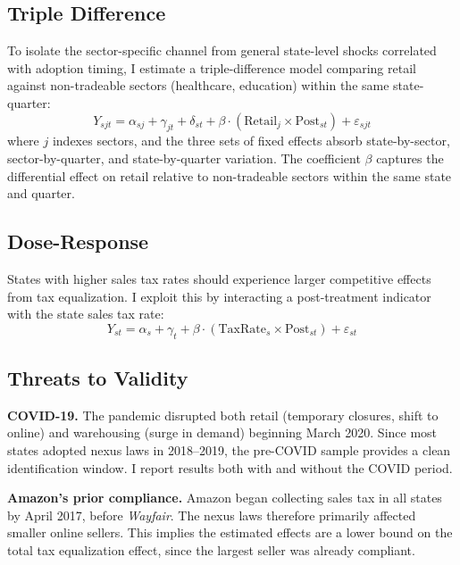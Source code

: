 \documentclass[12pt]{article}
\begin{document}
\subsection{Triple Difference}

To isolate the sector-specific channel from general state-level shocks correlated with adoption timing, I estimate a triple-difference model comparing retail against non-tradeable sectors (healthcare, education) within the same state-quarter:
\begin{equation}
  Y_{sjt} = \alpha_{sj} + \gamma_{jt} + \delta_{st} + \beta \cdot (\text{Retail}_j \times \text{Post}_{st}) + \varepsilon_{sjt}
\end{equation}
where $j$ indexes sectors, and the three sets of fixed effects absorb state-by-sector, sector-by-quarter, and state-by-quarter variation. The coefficient $\beta$ captures the differential effect on retail relative to non-tradeable sectors within the same state and quarter.

\subsection{Dose-Response}

States with higher sales tax rates should experience larger competitive effects from tax equalization. I exploit this by interacting a post-treatment indicator with the state sales tax rate:
\begin{equation}
  Y_{st} = \alpha_s + \gamma_t + \beta \cdot (\text{TaxRate}_s \times \text{Post}_{st}) + \varepsilon_{st}
\end{equation}

\subsection{Threats to Validity}

\textbf{COVID-19.} The pandemic disrupted both retail (temporary closures, shift to online) and warehousing (surge in demand) beginning March 2020. Since most states adopted nexus laws in 2018--2019, the pre-COVID sample provides a clean identification window. I report results both with and without the COVID period.

\textbf{Amazon's prior compliance.} Amazon began collecting sales tax in all states by April 2017, before \textit{Wayfair}. The nexus laws therefore primarily affected smaller online sellers. This implies the estimated effects are a lower bound on the total tax equalization effect, since the largest seller was already compliant.
\end{document}
